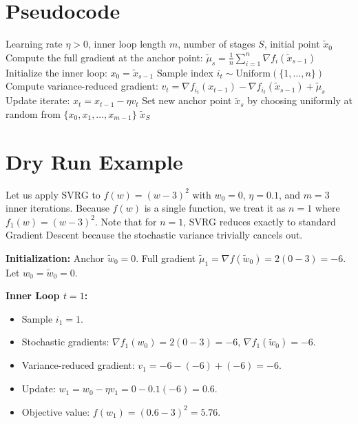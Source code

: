 \documentclass[11pt]{article}
\begin{document}
\section*{Pseudocode}
\begin{algorithm}[H]
\caption{Stochastic Variance Reduced Gradient (SVRG)}
\begin{algorithmic}[1]
\REQUIRE Learning rate $\eta > 0$, inner loop length $m$, number of stages $S$, initial point $\tilde{x}_0$
    \STATE Compute the full gradient at the anchor point: $\tilde{\mu}_s = \frac{1}{n} \sum_{i=1}^n \nabla f_i(\tilde{x}_{s-1})$
    \STATE Initialize the inner loop: $x_0 = \tilde{x}_{s-1}$
        \STATE Sample index $i_t \sim \text{Uniform}(\{1, \dots, n\})$
        \STATE Compute variance-reduced gradient: $v_t = \nabla f_{i_t}(x_{t-1}) - \nabla f_{i_t}(\tilde{x}_{s-1}) + \tilde{\mu}_s$
        \STATE Update iterate: $x_t = x_{t-1} - \eta v_t$
    \ENDFOR
    \STATE Set new anchor point $\tilde{x}_s$ by choosing uniformly at random from $\{x_0, x_1, \dots, x_{m-1}\}$
\ENDFOR
\RETURN $\tilde{x}_S$
\end{algorithmic}
\end{algorithm}

\section*{Dry Run Example}
Let us apply SVRG to $f(w) = (w-3)^2$ with $w_0 = 0$, $\eta = 0.1$, and $m = 3$ inner iterations. Because $f(w)$ is a single function, we treat it as $n=1$ where $f_1(w) = (w-3)^2$. Note that for $n=1$, SVRG reduces exactly to standard Gradient Descent because the stochastic variance trivially cancels out.

\textbf{Initialization:} 
Anchor $\tilde{w}_0 = 0$. Full gradient $\tilde{\mu}_1 = \nabla f(\tilde{w}_0) = 2(0-3) = -6$. Let $w_0 = \tilde{w}_0 = 0$.

\textbf{Inner Loop $t=1$:}
\begin{itemize}
    \item Sample $i_1 = 1$.
    \item Stochastic gradients: $\nabla f_1(w_0) = 2(0-3) = -6$, $\nabla f_1(\tilde{w}_0) = -6$.
    \item Variance-reduced gradient: $v_1 = -6 - (-6) + (-6) = -6$.
    \item Update: $w_1 = w_0 - \eta v_1 = 0 - 0.1(-6) = 0.6$.
    \item Objective value: $f(w_1) = (0.6 - 3)^2 = 5.76$.
\end{itemize}
\end{document}
